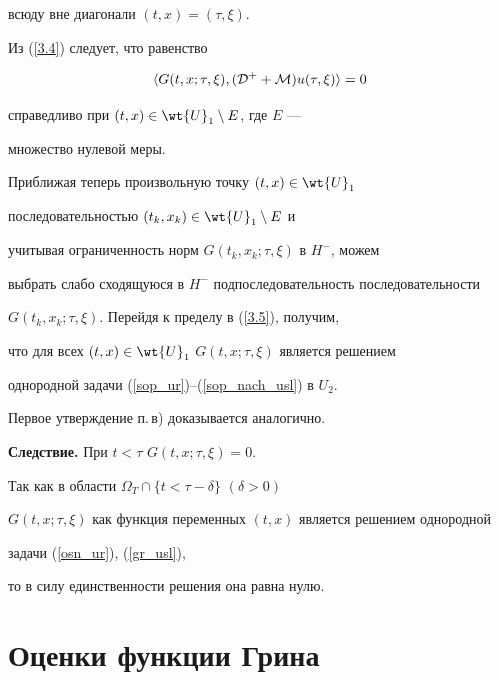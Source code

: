 \begin{pf}
всюду вне диагонали $(t,x)=(\tau,\xi)$.





Из (\ref{3.4}) следует, что равенство


\begin{equation}


\la G(t,x;\tau,\xi),({\cal D}^+ +{\cal M})u(\tau,\xi)\ra=0


\label{3.5}


\end{equation} 


справедливо при $(t,x)\in \wt{U}_1\setminus E$, где $E$ ---


множество нулевой меры.


Приближая теперь произвольную точку $(t,x)\in \wt{ U}_1$


последовательностью $(t_k,x_k)\in \wt{U}_1\setminus E$ и


учитывая ограниченность норм $G(t_k,x_k;\tau,\xi)$ в $H^-$, можем


выбрать слабо сходящуюся в $H^-$ подпоследовательность последовательности 


$G(t_k,x_k;\tau,\xi)$. Перейдя к пределу в (\ref{3.5}), получим,


что для всех $(t,x)\in \wt{U}_1$ $G(t,x;\tau,\xi)$ является решением


однородной задачи (\ref{sop_ur})--(\ref{sop_nach_usl}) в ${U}_2$.


Первое утверждение п.\,в) доказывается аналогично.


\end{pf}


 


{\bf Следствие.} При $t<\tau$ $G(t,x;\tau,\xi)=0$.


\medskip


 


Так как в области $\Omega_T\cap \{ t<\tau-\delta\}$ $(\delta>0)$


$G(t,x;\tau,\xi)$ как функция переменных $(t,x)$ является решением однородной


задачи (\ref{osn_ur}), (\ref{gr_usl}),


то в силу единственности решения она равна нулю.





\section{Оценки функции Грина}





